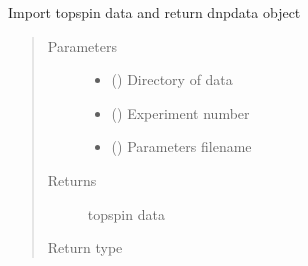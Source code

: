 \documentclass[letterpaper,10pt,english]{sphinxmanual}
\begin{document}
\begin{fulllineitems}
\label{\detokenize{dnpImport:dnpLab.dnpImport.topspin.import_topspin}}
Import topspin data and return dnpdata object
\begin{quote}\begin{description}
\item[{Parameters}] \leavevmode\begin{itemize}
\item {} 
 () \sphinxhyphen{}\sphinxhyphen{} Directory of data

\item {} 
 () \sphinxhyphen{}\sphinxhyphen{} Experiment number

\item {} 
 () \sphinxhyphen{}\sphinxhyphen{} Parameters filename

\end{itemize}

\item[{Returns}] \leavevmode
topspin data

\item[{Return type}] \leavevmode
{\hyperref[\detokenize{dnpData:dnpLab.dnpdata}]{}}

\end{description}\end{quote}

\end{fulllineitems}

\end{document}
